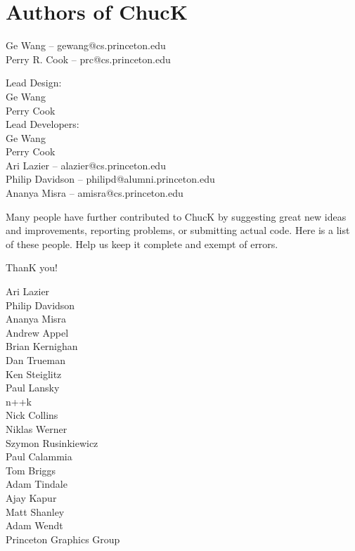 \newpage
\section{Authors of ChucK}

Ge Wang -- gewang@cs.princeton.edu\\
Perry R. Cook -- prc@cs.princeton.edu

Lead Design:\\
\authtab Ge Wang\\
\authtab Perry Cook\\

Lead Developers:\\
\authtab Ge Wang\\
\authtab Perry Cook\\
\authtab Ari Lazier -- alazier@cs.princeton.edu\\
\authtab Philip Davidson -- philipd@alumni.princeton.edu\\
\authtab Ananya Misra -- amisra@cs.princeton.edu

Many people have further contributed to ChucK by suggesting great new 
ideas and improvements, reporting problems, or submitting actual code. 
Here is a list of these people.  Help us keep it complete and exempt of 
errors.  

ThanK you!


Ari Lazier\\
Philip Davidson\\
Ananya Misra\\
Andrew Appel\\
Brian Kernighan\\
Dan Trueman\\
Ken Steiglitz\\
Paul Lansky\\
n++k\\
Nick Collins\\
Niklas Werner\\
Szymon Rusinkiewicz\\
Paul Calammia\\
Tom Briggs\\
Adam Tindale\\
Ajay Kapur\\
Matt Shanley\\
Adam Wendt\\
Princeton Graphics Group\\
